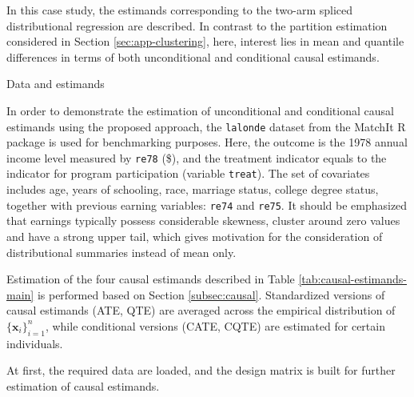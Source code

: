 \documentclass[article]{jss}\usepackage[]{graphicx}\usepackage[]{xcolor}
\DeclareRobustCommand{\pkg}[1]{\textsf{#1}}
\DeclareRobustCommand{\code}[1]{\nolinkurl{#1}}
\begin{document}
In this case study, the estimands corresponding to the two-arm spliced distributional regression are described. In contrast to the partition estimation considered in Section \ref{sec:app-clustering}, here, interest lies in mean and quantile differences in terms of both unconditional and conditional causal estimands.

Data and estimands

In order to demonstrate the estimation of unconditional and conditional causal estimands using the proposed approach, the \code{lalonde} dataset from the \pkg{MatchIt} \textsf{R} package is used for benchmarking purposes. Here, the outcome is the 1978 annual income level measured by \code{re78} (\$), and the treatment indicator equals to the indicator for program participation (variable \code{treat}). The set of covariates includes age, years of schooling, race, marriage status, college degree status, together with previous earning variables: \code{re74} and \code{re75}. It should be emphasized that earnings typically possess considerable skewness, cluster around zero values and have a strong upper tail, which gives motivation for the consideration of distributional summaries instead of mean only.

Estimation of the four causal estimands described in Table \ref{tab:causal-estimands-main} is performed based on Section \ref{subsec:causal}. Standardized versions of causal estimands (ATE, QTE) are averaged across the empirical distribution of \(\{\boldsymbol{x}_i\}_{i=1}^n\), while conditional versions (CATE, CQTE) are estimated for certain individuals.

At first, the required data are loaded, and the design matrix is built for further estimation of causal estimands.
\end{document}
